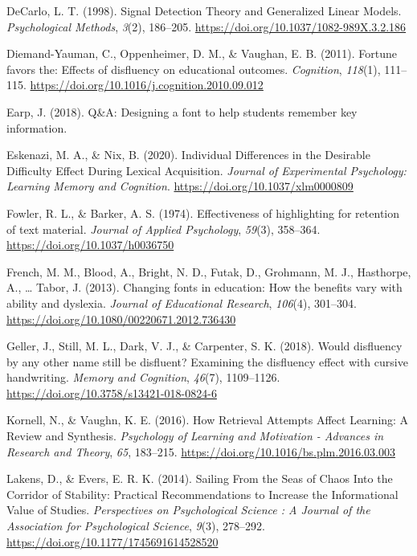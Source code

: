 \documentclass[english,doc]{apa6}
\begin{document}
\leavevmode\hypertarget{ref-DeCarlo1998}{}%
DeCarlo, L. T. (1998). Signal Detection Theory and Generalized Linear Models. \emph{Psychological Methods}, \emph{3}(2), 186--205. \url{https://doi.org/10.1037/1082-989X.3.2.186}

\leavevmode\hypertarget{ref-Diemand-Yauman2011}{}%
Diemand-Yauman, C., Oppenheimer, D. M., \& Vaughan, E. B. (2011). Fortune favors the: Effects of disfluency on educational outcomes. \emph{Cognition}, \emph{118}(1), 111--115. \url{https://doi.org/10.1016/j.cognition.2010.09.012}

\leavevmode\hypertarget{ref-Earp2018}{}%
Earp, J. (2018). Q\&A: Designing a font to help students remember key information.

\leavevmode\hypertarget{ref-Eskenazi2020}{}%
Eskenazi, M. A., \& Nix, B. (2020). Individual Differences in the Desirable Difficulty Effect During Lexical Acquisition. \emph{Journal of Experimental Psychology: Learning Memory and Cognition}. \url{https://doi.org/10.1037/xlm0000809}

\leavevmode\hypertarget{ref-Fowler1974}{}%
Fowler, R. L., \& Barker, A. S. (1974). Effectiveness of highlighting for retention of text material. \emph{Journal of Applied Psychology}, \emph{59}(3), 358--364. \url{https://doi.org/10.1037/h0036750}

\leavevmode\hypertarget{ref-French2013}{}%
French, M. M., Blood, A., Bright, N. D., Futak, D., Grohmann, M. J., Hasthorpe, A., \ldots{} Tabor, J. (2013). Changing fonts in education: How the benefits vary with ability and dyslexia. \emph{Journal of Educational Research}, \emph{106}(4), 301--304. \url{https://doi.org/10.1080/00220671.2012.736430}

\leavevmode\hypertarget{ref-Geller2018}{}%
Geller, J., Still, M. L., Dark, V. J., \& Carpenter, S. K. (2018). Would disfluency by any other name still be disfluent? Examining the disfluency effect with cursive handwriting. \emph{Memory and Cognition}, \emph{46}(7), 1109--1126. \url{https://doi.org/10.3758/s13421-018-0824-6}

\leavevmode\hypertarget{ref-Kornell2016}{}%
Kornell, N., \& Vaughn, K. E. (2016). How Retrieval Attempts Affect Learning: A Review and Synthesis. \emph{Psychology of Learning and Motivation - Advances in Research and Theory}, \emph{65}, 183--215. \url{https://doi.org/10.1016/bs.plm.2016.03.003}

\leavevmode\hypertarget{ref-Lakens2014}{}%
Lakens, D., \& Evers, E. R. K. (2014). Sailing From the Seas of Chaos Into the Corridor of Stability: Practical Recommendations to Increase the Informational Value of Studies. \emph{Perspectives on Psychological Science : A Journal of the Association for Psychological Science}, \emph{9}(3), 278--292. \url{https://doi.org/10.1177/1745691614528520}
\end{document}
